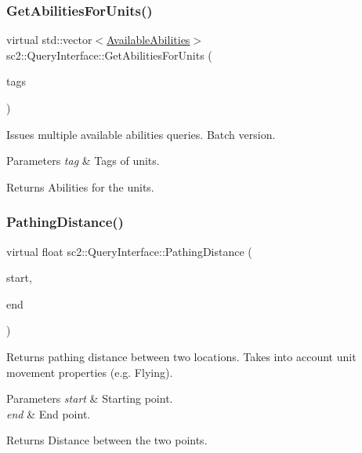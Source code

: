 \subsubsection{\texorpdfstring{Get\+Abilities\+For\+Units()}{GetAbilitiesForUnits()}}
{\footnotesize\ttfamily virtual std\+::vector$<$\hyperlink{structsc2_1_1_available_abilities}{Available\+Abilities}$>$ sc2\+::\+Query\+Interface\+::\+Get\+Abilities\+For\+Units (\begin{DoxyParamCaption}\item[{const std\+::vector$<$ Tag $>$ \&}]{tags }\end{DoxyParamCaption})\hspace{0.3cm}{\ttfamily [pure virtual]}}

Issues multiple available abilities queries. Batch version. 
\begin{DoxyParams}{Parameters}
{\em tag} & Tags of units. \\
\hline
\end{DoxyParams}
\begin{DoxyReturn}{Returns}
Abilities for the units. 
\end{DoxyReturn}
\mbox{\label{classsc2_1_1_query_interface_adf72c7556e59e82e231d9c58bd093546}} 
\subsubsection{\texorpdfstring{Pathing\+Distance()}{PathingDistance()}\hspace{0.1cm}{\footnotesize\ttfamily [1/2]}}
{\footnotesize\ttfamily virtual float sc2\+::\+Query\+Interface\+::\+Pathing\+Distance (\begin{DoxyParamCaption}\item[{const \hyperlink{structsc2_1_1_point2_d}{Point2D} \&}]{start,  }\item[{const \hyperlink{structsc2_1_1_point2_d}{Point2D} \&}]{end }\end{DoxyParamCaption})\hspace{0.3cm}{\ttfamily [pure virtual]}}

Returns pathing distance between two locations. Takes into account unit movement properties (e.\+g. Flying). 
\begin{DoxyParams}{Parameters}
{\em start} & Starting point. \\
\hline
{\em end} & End point. \\
\hline
\end{DoxyParams}
\begin{DoxyReturn}{Returns}
Distance between the two points. 
\end{DoxyReturn}
\mbox{\label{classsc2_1_1_query_interface_a1a7216c7ad37273dc54e12a92fee7a64}} 
